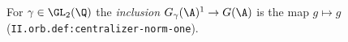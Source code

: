 For $\gamma\in\GL_2(\Q)$ the \emph{inclusion} $G_\gamma(\A)^1\to G(\A)$ is the map $g\mapsto g$ (\texttt{II.orb.def:centralizer-norm-one}).
